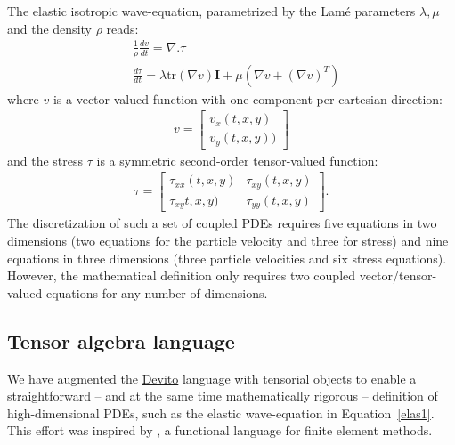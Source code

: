 \documentclass[conference]{IEEEtran}
\begin{document}
The elastic isotropic wave-equation, parametrized by the Lamé parameters
$\lambda, \mu$ and the density $\rho$ reads:
%
\begin{equation}
\begin{aligned}
&\frac{1}{\rho}\frac{dv}{dt} = \nabla . \tau \\
&\frac{d \tau}{dt} = \lambda \mathrm{tr}(\nabla v) \mathbf{I}  + \mu (\nabla v + (\nabla v)^T)
\end{aligned}
\label{elas1}
\end{equation}
%
 where $v$ is a vector valued function with one component per cartesian
direction:
%
\begin{equation}
\begin{split}
v =  \begin{bmatrix} v_x(t, x, y) \\ v_y(t, x, y)) \end{bmatrix}
\end{split}
\label{partvel}
\end{equation}
%
 and the stress $\tau$ is a symmetric second-order tensor-valued
function:
%
\begin{equation}
\begin{aligned}
    \tau = \begin{bmatrix}\tau_{xx}(t, x, y) & \tau_{xy}(t, x, y)\\\tau_{xy}t, x, y) & \tau_{yy}(t, x, y)\end{bmatrix}.
\end{aligned}
\label{stress}
\end{equation}
%
 The discretization of such a set of coupled PDEs requires five
equations in two dimensions (two equations for the particle velocity and
three for stress) and nine equations in three dimensions (three particle
velocities and six stress equations). However, the mathematical
definition only requires two coupled vector/tensor-valued equations for
any number of dimensions.

\subsection{Tensor algebra language}\label{tensor-algebra-language}

We have augmented the
\href{https://github.com/devitocodes/devito}{Devito} language with
tensorial objects to enable a straightforward -- and at the same time
mathematically rigorous -- definition of high-dimensional PDEs, such as
the elastic wave-equation in Equation~\ref{elas1}. This effort was
inspired by \cite{ufl}, a functional language for finite element
methods.
\end{document}
